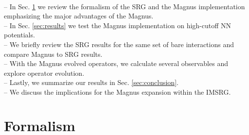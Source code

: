 \documentclass[preprintnumbers,floatfix,aps,prc,preprint,nofootinbib]{revtex4-1}
\begin{document}
\\
-- In Sec. \ref{sec:formalism} we review the formalism of the SRG and the Magnus implementation emphasizing the major advantages of the Magnus.
\\
-- In Sec. \ref{sec:results} we test the Magnus implementation on high-cutoff NN potentials.
\\
-- We briefly review the SRG results for the same set of bare interactions and compare Magnus to SRG results.
\\
-- With the Magnus evolved operators, we calculate several observables and explore operator evolution.
\\
-- Lastly, we summarize our results in Sec. \ref{sec:conclusion}.
\\
-- We discuss the implications for the Magnus expansion within the IMSRG.


\section{Formalism}
\label{sec:formalism}
\end{document}
